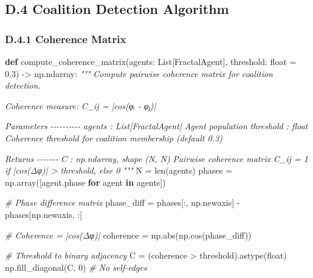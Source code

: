 \documentclass[
]{article}
\newenvironment{Shaded}{}{}
\newcommand{\BuiltInTok}[1]{\textcolor[rgb]{0.00,0.50,0.00}{#1}}
\newcommand{\CommentTok}[1]{\textcolor[rgb]{0.38,0.63,0.69}{\textit{#1}}}
\newcommand{\ControlFlowTok}[1]{\textcolor[rgb]{0.00,0.44,0.13}{\textbf{#1}}}
\newcommand{\DecValTok}[1]{\textcolor[rgb]{0.25,0.63,0.44}{#1}}
\newcommand{\FloatTok}[1]{\textcolor[rgb]{0.25,0.63,0.44}{#1}}
\newcommand{\KeywordTok}[1]{\textcolor[rgb]{0.00,0.44,0.13}{\textbf{#1}}}
\newcommand{\NormalTok}[1]{#1}
\newcommand{\OperatorTok}[1]{\textcolor[rgb]{0.40,0.40,0.40}{#1}}
\begin{document}
\subsection{D.4 Coalition Detection
Algorithm}\label{d.4-coalition-detection-algorithm}

\subsubsection{D.4.1 Coherence Matrix}\label{d.4.1-coherence-matrix}

\begin{Shaded}
\begin{Highlighting}[]
\KeywordTok{def}\NormalTok{ compute\_coherence\_matrix(agents: List[FractalAgent],}
\NormalTok{                            threshold: }\BuiltInTok{float} \OperatorTok{=} \FloatTok{0.3}\NormalTok{) }\OperatorTok{{-}\textgreater{}}\NormalTok{ np.ndarray:}
    \CommentTok{"""}
\CommentTok{    Compute pairwise coherence matrix for coalition detection.}

\CommentTok{    Coherence measure:}
\CommentTok{        C\_ij = |cos(φᵢ {-} φⱼ)|}

\CommentTok{    Parameters}
\CommentTok{    {-}{-}{-}{-}{-}{-}{-}{-}{-}{-}}
\CommentTok{    agents : List[FractalAgent]}
\CommentTok{        Agent population}
\CommentTok{    threshold : float}
\CommentTok{        Coherence threshold for coalition membership (default 0.3)}

\CommentTok{    Returns}
\CommentTok{    {-}{-}{-}{-}{-}{-}{-}}
\CommentTok{    C : np.ndarray, shape (N, N)}
\CommentTok{        Pairwise coherence matrix}
\CommentTok{        C\_ij = 1 if |cos(Δφ)| \textgreater{} threshold, else 0}
\CommentTok{    """}
\NormalTok{    N }\OperatorTok{=} \BuiltInTok{len}\NormalTok{(agents)}
\NormalTok{    phases }\OperatorTok{=}\NormalTok{ np.array([agent.phase }\ControlFlowTok{for}\NormalTok{ agent }\KeywordTok{in}\NormalTok{ agents])}

    \CommentTok{\# Phase difference matrix}
\NormalTok{    phase\_diff }\OperatorTok{=}\NormalTok{ phases[:, np.newaxis] }\OperatorTok{{-}}\NormalTok{ phases[np.newaxis, :]}

    \CommentTok{\# Coherence = |cos(Δφ)|}
\NormalTok{    coherence }\OperatorTok{=}\NormalTok{ np.}\BuiltInTok{abs}\NormalTok{(np.cos(phase\_diff))}

    \CommentTok{\# Threshold to binary adjacency}
\NormalTok{    C }\OperatorTok{=}\NormalTok{ (coherence }\OperatorTok{\textgreater{}}\NormalTok{ threshold).astype(}\BuiltInTok{float}\NormalTok{)}
\NormalTok{    np.fill\_diagonal(C, }\DecValTok{0}\NormalTok{)  }\CommentTok{\# No self{-}edges}


\end{Highlighting}
\end{Shaded}
\end{document}

